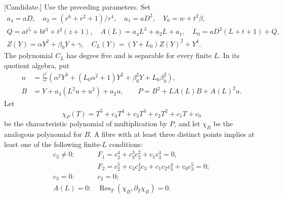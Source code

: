 \begin{lemma}
\label{lem:uniform-eleven-quintic-fibres-candidate}
\textup{[Candidate.]}
Use the preceding parameters. Set
\[
\begin{gathered}
 a_4=aD,\quad a_2=(r^6+r^2+1)/r^4,\quad a_1=aD^2,\quad
 Y_0=w+t^2\beta,\\
 Q=at^5+bt^3+t^2(z+1),\quad
 A(L)=a_4L^3+a_2L+a_1,\quad
 L_0=aD^2(L+t+1)+Q,\\
 Z(Y)=\alpha Y^2+\beta_0Y+\gamma,\quad
 C_L(Y)=(Y+L_0)Z(Y)^2+Y^4.
\end{gathered}                                                  \tag{E11.6}
\]
The polynomial $C_L$ has degree five and is separable for every finite
$L$. In its quotient algebra, put
\[
\begin{split}
 u&=\frac{t^2}{\gamma^2}
   \left(\alpha^2Y^3+(L_0\alpha^2+1)Y^2
                    +\beta_0^2Y+L_0\beta_0^2\right),\\
 B&=Y+a_4(L^2u+u^2)+a_2u,\qquad
 P=B^2+LA(L)B+A(L)^2u.
\end{split}                                                     \tag{E11.7}
\]
Let
\[
 \chi_P(T)=T^5+c_4T^4+c_3T^3+c_2T^2+c_1T+c_0
\]
be the characteristic polynomial of multiplication by $P$, and let
$\chi_B$ be the analogous polynomial for $B$. A fibre with at least
three distinct points implies at least one of the following finite-$L$
conditions:
\[
\begin{array}{ll}
 c_3\ne0:&
 F_1=c_2^4+c_3^3c_2^2+c_1c_3^4=0,\\
 &F_2=c_2^5+c_4c_2^4c_3+c_1c_2c_3^4+c_0c_3^5=0;\\[2pt]
 c_3=0:&c_2=0;\\[2pt]
 A(L)=0:&\operatorname{Res}_T(\chi_B,\partial_T\chi_B)=0.
\end{array}                                                     \tag{E11.8}
\]
\end{lemma}
